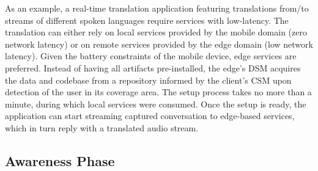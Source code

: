 As an example, a real-time translation application featuring translations from/to streams of different spoken languages require services with low-latency. The translation can either rely on local services provided by the mobile domain (zero network latency) or on remote services provided by the edge domain (low network latency). Given the battery constraints of the mobile device, edge services are preferred. Instead of having all artifacts pre-installed, the edge's DSM acquires the data and codebase from a repository informed by the client's CSM upon detection of the user in its coverage area. The setup process takes no more than a minute, during which local services were consumed. Once the setup is ready, the application can start streaming captured conversation to edge-based services, which in turn reply with a translated audio stream.





\subsection*{Awareness Phase}\label{sec:A3-E-awareness}




